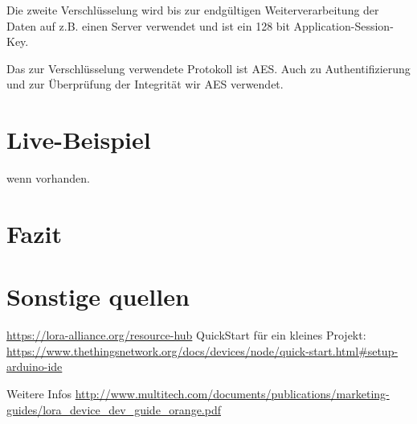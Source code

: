 \documentclass[a4paper,12pt]{article}
\begin{document}
    Die zweite Verschlüsselung wird bis zur endgültigen Weiterverarbeitung der Daten auf z.B. einen Server verwendet und ist ein 128 bit Application-Session-Key.

    Das zur Verschlüsselung verwendete Protokoll ist AES. Auch zu Authentifizierung und zur Überprüfung der Integrität wir AES verwendet.
    \cite{LoRaSecur}
        \cite{RFC8376}
        \cite{WhatIsLoRa}

    \section{Live-Beispiel}
    wenn vorhanden.

    \section{Fazit}
    \section{Sonstige quellen}
    \url{https://lora-alliance.org/resource-hub}
    QuickStart für ein kleines Projekt: \url{https://www.thethingsnetwork.org/docs/devices/node/quick-start.html#setup-arduino-ide}

    Weitere Infos \url{http://www.multitech.com/documents/publications/marketing-guides/lora_device_dev_guide_orange.pdf}
    \newpage
    
    
\end{document}

